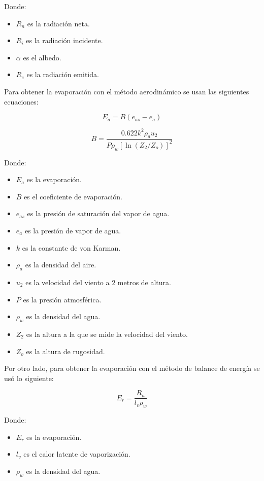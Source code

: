 \documentclass{article}  %
\begin{document}
Donde:

\begin{itemize}
  \item $R_n$ es la radiación neta.
  \item $R_i$ es la radiación incidente.
  \item $\alpha$ es el albedo.
  \item $R_e$ es la radiación emitida.
\end{itemize}

Para obtener la evaporación con el método aerodinámico se usan las siguientes ecuaciones:

\begin{equation}
  E_a = B(e_{as} - e_a)
\end{equation}
  
\begin{equation}
  B = \frac{0.622 k^2 \rho_a u_2}{P \rho_w [\ln(Z_2 / Z_o)]^2}
\end{equation}

Donde:

\begin{itemize}
  \item $E_a$ es la evaporación.
  \item $B$ es el coeficiente de evaporación.
  \item $e_{as}$ es la presión de saturación del vapor de agua.
  \item $e_a$ es la presión de vapor de agua.
  \item $k$ es la constante de von Karman.
  \item $\rho_a$ es la densidad del aire.
  \item $u_2$ es la velocidad del viento a 2 metros de altura.
  \item $P$ es la presión atmosférica.
  \item $\rho_w$ es la densidad del agua.
  \item $Z_2$ es la altura a la que se mide la velocidad del viento.
  \item $Z_o$ es la altura de rugosidad.
\end{itemize}

Por otro lado, para obtener la evaporación con el método de balance de energía se usó lo siguiente:

\begin{equation}
  E_r = \frac{R_n}{l_v \rho_w}
\end{equation}

Donde:

\begin{itemize}
  \item $E_r$ es la evaporación.
  \item $l_v$ es el calor latente de vaporización.
  \item $\rho_w$ es la densidad del agua.
\end{itemize}
\end{document}
